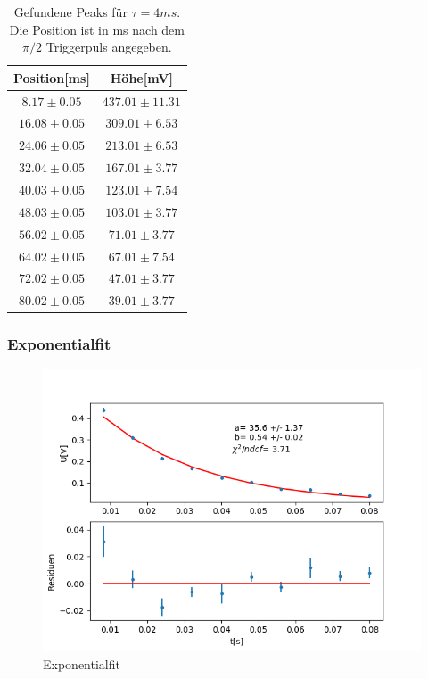 \documentclass[12pt,a4paper]{article}
\begin{document}
\begin{table}
\centering
\begin{tabular}{|c|c|}
\hline 
Position[ms] & Höhe[mV]\\ 
\hline
$ 8.17 \pm 0.05 $ & $ 437.01 \pm 11.31 $ \\
\hline
$ 16.08 \pm 0.05 $ & $ 309.01 \pm 6.53 $ \\
\hline
$ 24.06 \pm 0.05 $ & $ 213.01 \pm 6.53 $ \\
\hline
$ 32.04 \pm 0.05 $ & $ 167.01 \pm 3.77 $ \\
\hline
$ 40.03 \pm 0.05 $ & $ 123.01 \pm 7.54 $ \\
\hline
$ 48.03 \pm 0.05 $ & $ 103.01 \pm 3.77 $ \\
\hline
$ 56.02 \pm 0.05 $ & $ 71.01 \pm 3.77 $ \\
\hline
$ 64.02 \pm 0.05 $ & $ 67.01 \pm 7.54 $ \\
\hline
$ 72.02 \pm 0.05 $ & $ 47.01 \pm 3.77 $ \\
\hline
$ 80.02 \pm 0.05 $ & $ 39.01 \pm 3.77 $ \\
\hline
\end{tabular}
\caption{Gefundene Peaks für $\tau = 4ms$. Die Position ist in ms nach dem $\pi /2$ Triggerpuls angegeben.}
\label{tab:Peaks}
\end{table}
\newpage
\subsubsection{Exponentialfit}

\begin{figure}
\centering
\includegraphics[scale=0.9]{Bilder/T2exp.png}
\caption{Exponentialfit}
\label{fig:T2exp}
\end{figure}
\end{document}
